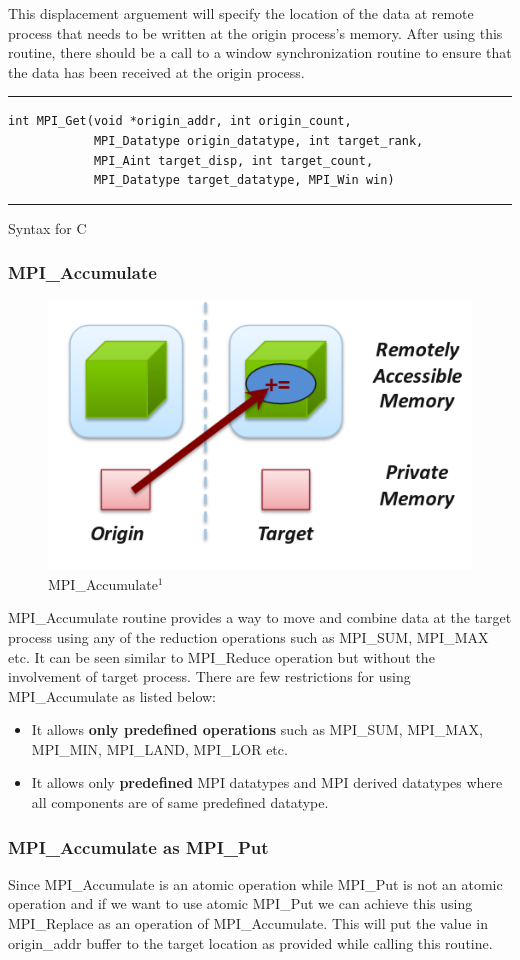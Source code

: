 This displacement arguement will specify the location of the data at remote process that needs to be written at the origin process's memory. After
using this routine, there should be a call to a window synchronization routine to ensure that the data has been received at the origin process.
\begin{listing}[!ht]
\hrule \vspace{5pt}
\begin{verbatim}
int MPI_Get(void *origin_addr, int origin_count, 
            MPI_Datatype origin_datatype, int target_rank,
            MPI_Aint target_disp, int target_count,
            MPI_Datatype target_datatype, MPI_Win win)
\end{verbatim}
\hrule
\caption{Syntax for C}
\end{listing}

\subsubsection{{\ttfamily \large MPI\_Accumulate}}
\begin{figure}[!ht]
    \centering
    \includegraphics[width=0.35\linewidth]{attachments/accum_rma.png}
    \caption{MPI\_Accumulate$^1$}
\end{figure}
{\ttfamily MPI\_Accumulate} routine provides a way to move and combine data at the target process using any of the reduction operations such as
{\ttfamily MPI\_SUM, MPI\_MAX} etc. It can be seen similar to {\ttfamily MPI\_Reduce} operation but without the involvement of target process. There
are few restrictions for using {\ttfamily MPI\_Accumulate} as listed below:
\begin{itemize}
    \item It allows \textbf{only predefined operations} such as {\ttfamily MPI\_SUM, MPI\_MAX, MPI\_MIN, MPI\_LAND, MPI\_LOR} etc.
    \item It allows only \textbf{predefined} MPI datatypes and MPI derived datatypes where all components are of same predefined datatype.
\end{itemize}
\subsubsection{{\ttfamily MPI\_Accumulate as MPI\_Put}}
Since {\ttfamily MPI\_Accumulate} is an atomic operation while {\ttfamily MPI\_Put} is not an atomic operation and if we want to use atomic
{\ttfamily  MPI\_Put} we can achieve this using {\ttfamily MPI\_Replace} as an operation of {\ttfamily MPI\_Accumulate}. This will put the value in {\ttfamily origin\_addr} buffer to the target location as provided while calling this routine.

